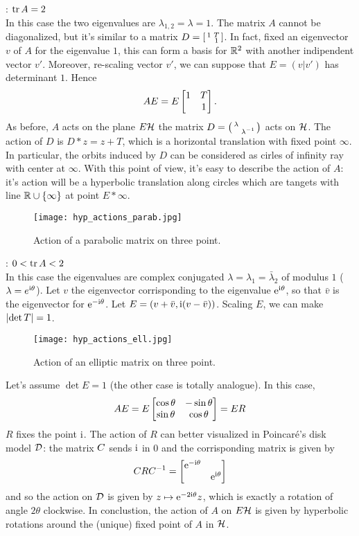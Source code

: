 : $\operatorname{tr} A=2$\\
In this case the two eigenvalues are $\lambda_{1,2}=\lambda=1$. The matrix $A$ cannot be diagonalized, but it's similar to a matrix $D=\left[\begin{smallmatrix} 1&T\\&1 \end{smallmatrix}\right]$. In fact, fixed an eigenvector $v$ of $A$ for the eigenvalue $1$, this can form a basis for $\mathbb{R}^{2}$ with another indipendent vector $v'$. Moreover, re-scaling vector $v'$, we can suppose that $E=(v|v')$ has determinant $1$. Hence
\[
AE=E\begin{bmatrix} 1&T\\&1 \end{bmatrix}.
\]
As before, $A$ acts on the plane $E\mathcal{H}$  the matrix $D=\left(\begin{smallmatrix} \lambda&\\&\lambda^{-1} \end{smallmatrix}\right)$ acts on $\mathcal{H}$. The action of $D$ is $D\ast z=z+T$, which is a horizontal translation with fixed point $\infty$. In particular, the orbits induced by $D$ can be considered as cirles of infinity ray with center at $\infty$. With this point of view, it's easy to describe the action of $A$: it's action will be a hyperbolic translation along circles which are tangets with line $\mathbb{R}\cup\{\infty\}$ at point $E\ast\infty$.%
\begin{figure}[H]
\centering
\texttt{[image: hyp\_actions\_parab.jpg]}
  \noindent\\
  \decoRule
  \caption{Action of a parabolic matrix on three point.}
  \label{fig:hyp_action_parab}
\end{figure}


: $0<\operatorname{tr} A<2$\\

In this case the eigenvalues are complex conjugated $\lambda=\lambda_{1}=\bar{\lambda}_{2}$ of modulus $1$ ($\lambda=e^{\mathrm{i}\theta}$). Let $v$ the eigenvector corrisponding to the eigenvalue $\mathrm{e}^{\mathrm{i}\theta}$, so that $\bar{v}$ is the eigenvector for $\mathrm{e}^{-\mathrm{i}\theta}$. Let $E=(v+\bar{v},\mathrm{i}(v-\bar{v}))$. Scaling $E$, we can make $\left| \det T\right|=1$. 
\begin{figure}[H]
\centering
\texttt{[image: hyp\_actions\_ell.jpg]}
  \noindent\\
  \decoRule
  \caption{Action of an elliptic matrix on three point.}
  \label{fig:hyp_action_ell}
\end{figure}
Let's assume $\det E=1$ (the other case is totally analogue). In this case,
\[
AE=E\begin{bmatrix} 
\cos\theta&-\sin\theta\\\sin\theta&\cos\theta
 \end{bmatrix}=ER
\]
$R$ fixes the point $\mathrm{i}$. The action of $R$ can better visualized in Poincaré's disk model $\mathcal{D}$: the matrix $C$ sends $\mathrm{i}$ in $0$ and the corrisponding matrix is given by
\[
C RC^{-1}=\begin{bmatrix} \mathrm{e}^{-\mathrm{i}\theta}&\\&\mathrm{e}^{\mathrm{i}\theta} \end{bmatrix}
\] 
and so the action on $\mathcal{D}$ is given by $z\mapsto\mathrm{e}^{-2\mathrm{i}\theta}z$, which is exactly a rotation of angle $2\theta$ clockwise. In conclustion, the action of $A$ on $E\mathcal{H}$ is given by hyperbolic rotations around the (unique) fixed point of $A$ in $\mathcal{H}$.\\[2mm]

